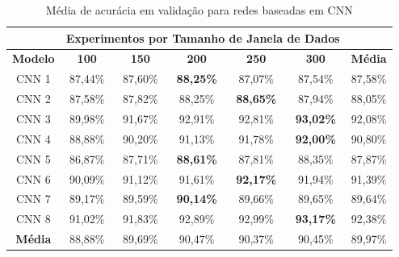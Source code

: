 \begin{table}[H]
\scriptsize
\centering
\caption{Média de acurácia em validação para redes baseadas em CNN} 
\label{table:cnn_results_tipo_superficie_1}
\begin{tabular}{ccccccc}
\cmidrule(lr){2-6}
& \multicolumn{5}{c}{\textbf{Experimentos por Tamanho de Janela de Dados}} & \multicolumn{1}{c}{} \\ \midrule
\textbf{Modelo} & \textbf{100} & \textbf{150} & \textbf{200} & \textbf{250} & \textbf{300} & \textbf{Média} \\ \midrule
CNN 1 & 87,44\% & 87,60\% & \textbf{88,25\%} & 87,07\% & 87,54\% & 87,58\% \\ \midrule
CNN 2 & 87,58\% & 87,82\% & 88,25\% & \textbf{88,65\%} & 87,94\% & 88,05\% \\ \midrule
CNN 3 & 89,98\% & 91,67\% & 92,91\% & 92,81\% & \textbf{93,02\%} & 92,08\% \\ \midrule
CNN 4 & 88,88\% & 90,20\% & 91,13\% & 91,78\% & \textbf{92,00\%} & 90,80\% \\ \midrule
CNN 5 & 86,87\% & 87,71\% & \textbf{88,61\%} & 87,81\% & 88,35\% & 87,87\% \\ \midrule
CNN 6 & 90,09\% & 91,12\% & 91,61\% & \textbf{92,17\%} & 91,94\% & 91,39\% \\ \midrule
CNN 7 & 89,17\% & 89,59\% & \textbf{90,14\%} & 89,66\% & 89,65\% & 89,64\% \\ \midrule
CNN 8 & 91,02\% & 91,83\% & 92,89\% & 92,99\% & \cellcolor[HTML]{34FF34}\textbf{93,17\%} & 92,38\% \\ \midrule
\textbf{Média} & 88,88\% & 89,69\% & 90,47\% & 90,37\% & 90,45\% & 89,97\% \\ \bottomrule
\end{tabular}
\end{table}


